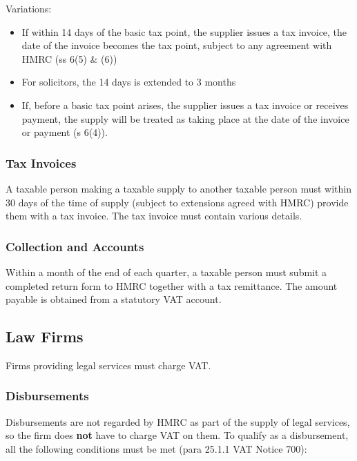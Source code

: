 \documentclass[
]{article}
\providecommand{\tightlist}{%
  \setlength{\itemsep}{0pt}\setlength{\parskip}{0pt}}
\begin{document}
Variations:

\begin{itemize}
\tightlist
\item
  If within 14 days of the basic tax point, the supplier issues a tax
  invoice, the date of the invoice becomes the tax point, subject to any
  agreement with HMRC (ss 6(5) \& (6))
\item
  For solicitors, the 14 days is extended to 3 months
\item
  If, before a basic tax point arises, the supplier issues a tax invoice
  or receives payment, the supply will be treated as taking place at the
  date of the invoice or payment (s 6(4)).
\end{itemize}

\hypertarget{tax-invoices}{%
\subsubsection{Tax Invoices}\label{tax-invoices}}

A taxable person making a taxable supply to another taxable person must
within 30 days of the time of supply (subject to extensions agreed with
HMRC) provide them with a tax invoice. The tax invoice must contain
various details.

\hypertarget{collection-and-accounts}{%
\subsubsection{Collection and Accounts}\label{collection-and-accounts}}

Within a month of the end of each quarter, a taxable person must submit
a completed return form to HMRC together with a tax remittance. The
amount payable is obtained from a statutory VAT account.

\hypertarget{law-firms}{%
\subsection{Law Firms}\label{law-firms}}

Firms providing legal services must charge VAT.

\hypertarget{disbursements}{%
\subsubsection{Disbursements}\label{disbursements}}

Disbursements are not regarded by HMRC as part of the supply of legal
services, so the firm does \textbf{not} have to charge VAT on them. To
qualify as a disbursement, all the following conditions must be met
(para 25.1.1 VAT Notice 700):
\end{document}
